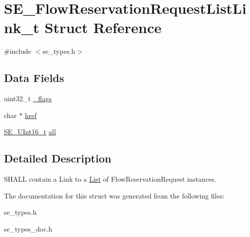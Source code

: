 \hypertarget{structSE__FlowReservationRequestListLink__t}{}\section{S\+E\+\_\+\+Flow\+Reservation\+Request\+List\+Link\+\_\+t Struct Reference}
\label{structSE__FlowReservationRequestListLink__t}


{\ttfamily \#include $<$se\+\_\+types.\+h$>$}

\subsection*{Data Fields}
\begin{DoxyCompactItemize}
\item 
uint32\+\_\+t \hyperlink{group__FlowReservationRequestListLink_ga303689b2785c25ec6c107fcc7d1a6a8f}{\+\_\+flags}
\item 
char $\ast$ \hyperlink{group__FlowReservationRequestListLink_ga1d73c03e68dab44c79e396b96b4fdd6a}{href}
\item 
\hyperlink{group__UInt16_gac68d541f189538bfd30cfaa712d20d29}{S\+E\+\_\+\+U\+Int16\+\_\+t} \hyperlink{group__FlowReservationRequestListLink_ga0db45858843bf00feee2e60960b642dd}{all}
\end{DoxyCompactItemize}


\subsection{Detailed Description}
S\+H\+A\+LL contain a Link to a \hyperlink{structList}{List} of Flow\+Reservation\+Request instances. 

The documentation for this struct was generated from the following files\+:\begin{DoxyCompactItemize}
\item 
se\+\_\+types.\+h\item 
se\+\_\+types\+\_\+doc.\+h\end{DoxyCompactItemize}
